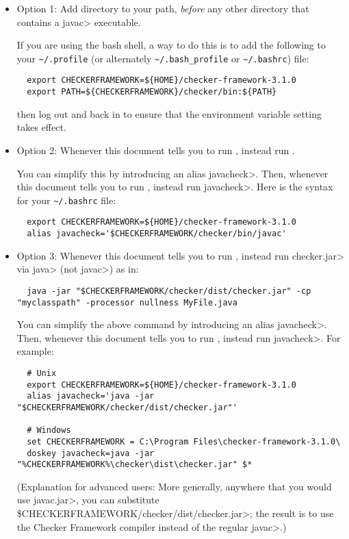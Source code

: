 \begin{itemize}
  \item
    Option 1:
    Add directory
     to your path, \emph{before} any other
    directory that contains a \<javac> executable.

    If you are
    using the bash shell, a way to do this is to add the following to your
    \verb|~/.profile| (or alternately \verb|~/.bash_profile| or \verb|~/.bashrc|) file:
\begin{Verbatim}
  export CHECKERFRAMEWORK=${HOME}/checker-framework-3.1.0
  export PATH=${CHECKERFRAMEWORK}/checker/bin:${PATH}
\end{Verbatim}
    then log out and back in to ensure that the environment variable
    setting takes effect.

  \item
    \begin{sloppypar}
    Option 2:
    Whenever this document tells you to run ,
    instead run .
    \end{sloppypar}

    You can simplify this by introducing an alias \<javacheck>.  Then,
    whenever this document tells you to run , instead run
    \<javacheck>.  Here is the syntax for your
    \verb|~/.bashrc| file:
\begin{Verbatim}
  export CHECKERFRAMEWORK=${HOME}/checker-framework-3.1.0
  alias javacheck='$CHECKERFRAMEWORK/checker/bin/javac'
\end{Verbatim}

   \item
   Option 3:
   Whenever this document tells you to run , instead
   run \<checker.jar> via \<java> (not \<javac>) as in:

\begin{Verbatim}
  java -jar "$CHECKERFRAMEWORK/checker/dist/checker.jar" -cp "myclasspath" -processor nullness MyFile.java
\end{Verbatim}

    You can simplify the above command by introducing an alias
    \<javacheck>.  Then, whenever this document tells you to run
    , instead run \<javacheck>.  For example:

\begin{Verbatim}
  # Unix
  export CHECKERFRAMEWORK=${HOME}/checker-framework-3.1.0
  alias javacheck='java -jar "$CHECKERFRAMEWORK/checker/dist/checker.jar"'

  # Windows
  set CHECKERFRAMEWORK = C:\Program Files\checker-framework-3.1.0\
  doskey javacheck=java -jar "%CHECKERFRAMEWORK%\checker\dist\checker.jar" $*
\end{Verbatim}

  (Explanation for advanced users:
  More generally, anywhere that you would use \<javac.jar>, you can substitute
  \<\$CHECKERFRAMEWORK/checker/dist/checker.jar>;
  the result is to use the Checker
  Framework compiler instead of the regular \<javac>.)

\end{itemize}




